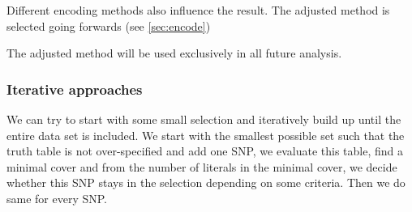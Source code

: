\documentclass[letterpaper, 11pt]{article}
\begin{document}
Different encoding methods also influence the result. The adjusted method is selected going forwards (see \ref{sec:encode})

\begin{figure}[h] 

\end{figure}

The adjusted method will be used exclusively in all future analysis. 

\subsubsection{Iterative approaches}
We can try to start with some small selection and iteratively build up until the entire data set is included. We start with the smallest possible set such that the truth table is not over-specified and add one SNP, we evaluate this table, find a minimal cover and from the number of literals in the minimal cover, we decide whether this SNP stays in the selection depending on some criteria. Then we do same for every SNP. 
\end{document}
